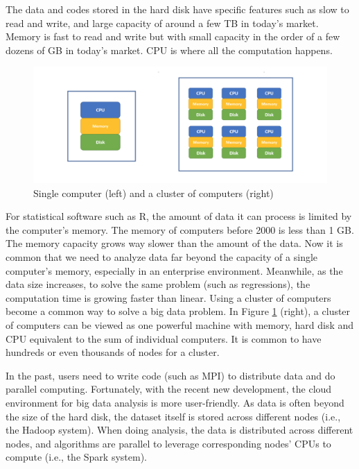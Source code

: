 \documentclass[12pt,]{krantz}
\begin{document}
The data and codes stored in the hard disk have specific features such as slow to read and write, and large capacity of around a few TB in today's market. Memory is fast to read and write but with small capacity in the order of a few dozens of GB in today's market. CPU is where all the computation happens.

\begin{figure}

{\centering \includegraphics[width=0.8\linewidth]{images/cluster} 

}

\caption{Single computer (left) and a cluster of computers (right)}\label{fig:sparkcluster}
\end{figure}

For statistical software such as R, the amount of data it can process is limited by the computer's memory. The memory of computers before 2000 is less than 1 GB. The memory capacity grows way slower than the amount of the data. Now it is common that we need to analyze data far beyond the capacity of a single computer's memory, especially in an enterprise environment. Meanwhile, as the data size increases, to solve the same problem (such as regressions), the computation time is growing faster than linear. Using a cluster of computers become a common way to solve a big data problem. In Figure \ref{fig:sparkcluster} (right), a cluster of computers can be viewed as one powerful machine with memory, hard disk and CPU equivalent to the sum of individual computers. It is common to have hundreds or even thousands of nodes for a cluster.

In the past, users need to write code (such as MPI) to distribute data and do parallel computing. Fortunately, with the recent new development, the cloud environment for big data analysis is more user-friendly. As data is often beyond the size of the hard disk, the dataset itself is stored across different nodes (i.e., the Hadoop system). When doing analysis, the data is distributed across different nodes, and algorithms are parallel to leverage corresponding nodes' CPUs to compute (i.e., the Spark system).
\end{document}
